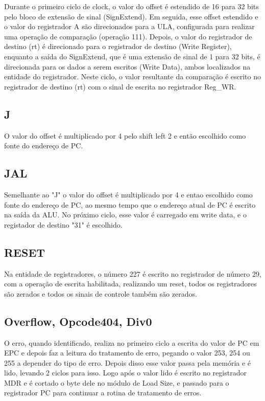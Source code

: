 Durante o primeiro ciclo de clock, o valor do offset é estendido de 16 para 32 bits pelo bloco de extensão de sinal (SignExtend). Em seguida, esse offset estendido e o valor do registrador A são direcionados para a ULA, configurada para realizar uma operação de comparação (operação 111). Depois, o valor do registrador de destino (rt) é direcionado para o registrador de destino (Write Register), enquanto a saída do SignExtend, que é uma extensão de sinal de 1 para 32 bits, é direcionada para os dados a serem escritos (Write Data), ambos localizados na entidade do registrador. Neste ciclo, o valor resultante da comparação é escrito no registrador de destino (rt) com o sinal de escrita no registrador Reg\_WR.

\subsection{J}

O valor do offset é multiplicado por 4 pelo shift left 2 e então escolhido como fonte do endereço de PC.

\subsection{JAL}

Semelhante ao "J" o valor do offset é multiplicado por 4 e entao escolhido como fonte do endereço de PC, ao mesmo tempo que o endereço atual de PC é escrito na saída da ALU. No próximo ciclo, esse valor é carregado em write data, e o registador de destino "31" é escolhido.
 
\subsection{RESET}

Na entidade de registradores, o número 227 é escrito no registrador de número 29, com a operação de escrita habilitada, realizando um reset, todos os registradores são zerados e todos os sinais de controle também são zerados.

\subsection{Overflow, Opcode404, Div0}

O erro, quando identificado, realiza no primeiro ciclo a escrita do valor de PC em EPC e depois faz a leitura do tratamento de erro, pegando o valor 253, 254 ou 255 a depender do tipo de erro. Depois disso esse valor passa pela memória e é lido, levando 2 ciclos para isso. Logo após o valor lido é escrito no registrador MDR e é cortado o byte dele no módulo de Load Size, e passado para o registrador PC para continuar a rotina de tratamento de erros.

